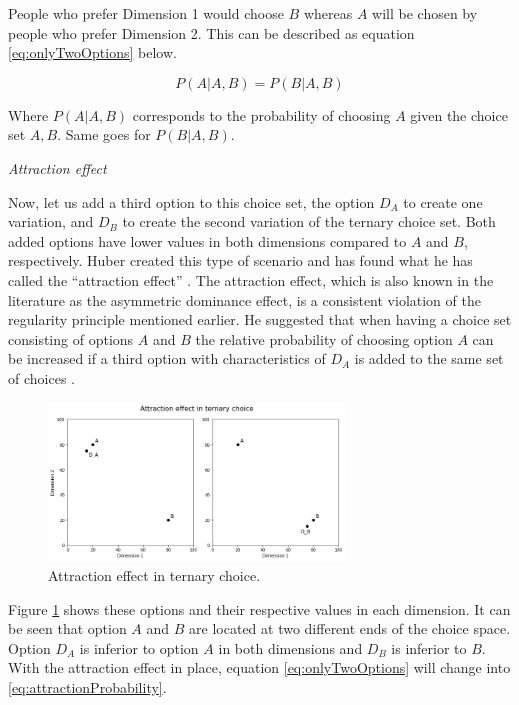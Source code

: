 \documentclass[a4paper,12pt]{article}
\newcommand{\citeyearonly}[1]{\citeyearpar{#1}}
\begin{document}
People who prefer Dimension 1 would choose $B$ whereas $A$ will be chosen by people who prefer Dimension 2. This can be described as equation \ref{eq:onlyTwoOptions} below.

\begin{equation}\label{eq:onlyTwoOptions}
    P(A|A,B) = P(B|A,B)
\end{equation}

Where $P(A|A,B)$ corresponds to the probability of choosing $A$ given the choice set $A,B$. Same goes for $P(B|A,B)$.

\textit{Attraction effect}

Now, let us add a third option to this choice set, the option $D_A$ to create one variation, and $D_B$ to create the second variation of the ternary choice set. Both added options have lower values in both dimensions compared to $A$ and $B$, respectively. Huber created this type of scenario and has found what he has called the ``attraction effect'' \citeyearonly{huberEtAl82}. The attraction effect, which is also known in the literature as the asymmetric dominance effect, is a consistent violation of the regularity principle mentioned earlier. He suggested that when having a choice set consisting of options $A$ and $B$ the relative probability of choosing option $A$ can be increased if a third option with characteristics of $D_A$ is added to the same set of choices \citeyearonly{huberEtAl82}.  

\begin{figure}[h]
    \centering
    \includegraphics[width=0.7\textwidth]{staticFiles/attractionEffect.png}
    \caption{Attraction effect in ternary choice.} %
    \label{fig:attractionEffect} %

\end{figure}

Figure \ref{fig:attractionEffect} shows these options and their respective values in each dimension. It can be seen that option $A$ and $B$ are located at two different ends of the choice space. Option $D_A$ is inferior to option $A$ in both dimensions and $D_B$ is inferior to $B$. With the attraction effect in place, equation \ref{eq:onlyTwoOptions} will change into \ref{eq:attractionProbability}.
\end{document}
